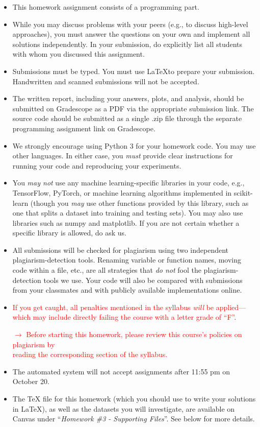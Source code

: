 \documentclass{article}
\begin{document}
\begin{itemize}
    \item This homework assignment consists of a programming part. 
    \item While you may discuss problems with your peers (e.g., to discuss high-level approaches), you must answer the questions on your own and implement all solutions independently. In your submission, do explicitly list all students with whom you discussed this assignment. 
    \item Submissions must be typed. You must use \LaTeX to prepare your submission. Handwritten and scanned submissions will not be accepted. 
    \item The written report, including your answers, plots, and analysis, should be submitted on Gradescope as a PDF via the appropriate submission link. The source code should be submitted as a single .zip file through the separate programming assignment link on Gradescope.
    \item We strongly encourage using Python 3 for your homework code. You may use other languages. In either case, you \textit{must} provide clear instructions for running your code and reproducing your experiments. 
    \item You \textit{may not} use any machine learning-specific libraries in your code, e.g., TensorFlow, PyTorch, or machine learning algorithms implemented in scikit-learn (though you \textit{may} use other functions provided by this library, such as one that splits a dataset into training and testing sets). You may also use libraries such as numpy and matplotlib. If you are not certain whether a specific library is allowed, do ask us.
    \item All submissions will be checked for plagiarism using two independent plagiarism-detection tools. Renaming variable or function names, moving code within a file, etc., are all strategies that \textit{do not} fool the plagiarism-detection tools we use. Your code will also be compared with submissions from your classmates and with publicly available implementations online. 
    \item \textcolor{red}{If you get caught, all penalties mentioned in the syllabus \textit{will} be applied---which may include directly failing the course with a letter grade of ``F''}.
    \begin{center}
        \textcolor{red}{$\rightarrow$ Before starting this homework, please review this course's policies on plagiarism by  \\reading the corresponding section of the syllabus.}
    \end{center}
    \item The automated system will not accept assignments after 11:55 pm on October 20. 
    \item The TeX file for this homework (which you should use to write your solutions in \LaTeX), as well as the datasets you will investigate, are available on Canvas under ``\textit{Homework \#3 - Supporting Files}''. See below for more details.
\end{itemize}
\end{document}
